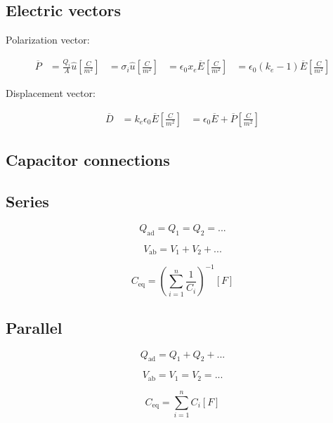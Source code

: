 \documentclass[letterpaper]{article}
\newcommand{\divline}{\noindent\makebox[\linewidth]{\rule{\textwidth}{0.4pt}}}
\begin{document}
    \divline
    \begin{multicols}{2}
        \section{Electric vectors}

        Polarization vector:

        \begin{align*}
            \overline{P} &= \frac{Q_{i}}{A} \hat{u} \left[ \frac{C}{m^{2}} \right]
                &= \sigma_{i} \hat{u} \left[ \frac{C}{m^{2}} \right]
                &= \epsilon_{0} x_{e} \overline{E} \left[ \frac{C}{m^{2}} \right]
                &= \epsilon_{0}(k_{e} - 1) \overline{E} \left[ \frac{C}{m^{2}} \right]
        \end{align*}

        Displacement vector:

        \begin{align*}
            \overline{D} &= k_{e} \epsilon_{0} \overline{E} \left[ \frac{C}{m^{2}} \right]
                &= \epsilon_{0} \overline{E} + \overline{P} \left[ \frac{C}{m^{2}} \right]
        \end{align*}
    \end{multicols}

    \divline
    \begin{multicols}{2}
        \section{Capacitor connections}

        \subsection{Series}

        \[Q_{\text{ad}} = Q_{1} = Q_{2} = ...\]

        \[V_{\text{ab}} = V_{1} + V_{2} + ...\]

        \[C_{\text{eq}} = \left( \sum_{i = 1}^{n} \frac{1}{C_{i}} \right)^{-1} [F]\]

        \subsection{Parallel}

        \[Q_{\text{ad}} = Q_{1} + Q_{2} + ...\]

        \[V_{\text{ab}} = V_{1} = V_{2} = ...\]

        \[C_{\text{eq}} = \sum_{i = 1}^{n} C_{i} [F]\]
        
    \end{multicols}
\end{document}
